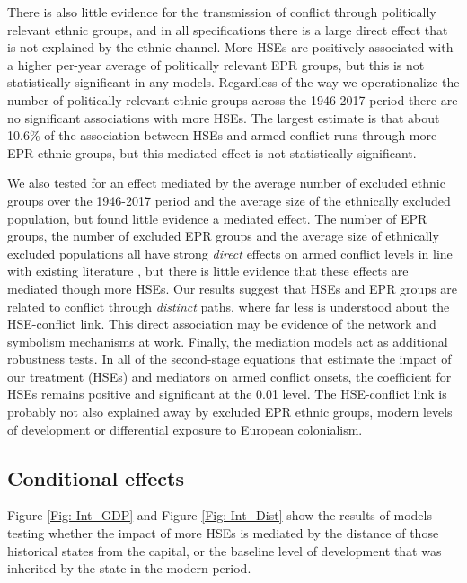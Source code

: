 There is also little evidence for the transmission of conflict through
politically relevant ethnic groups, and in all specifications there is a large
direct effect that is not explained by the ethnic channel. More HSEs are
positively associated with a higher per-year average of politically relevant EPR
groups, but this is not statistically significant in any models. Regardless of
the way we operationalize the number of politically relevant ethnic groups
across the 1946-2017 period 
there are no significant associations with more HSEs. The largest estimate is
that about 10.6\% of the association between HSEs and armed conflict runs
through more EPR ethnic groups, but this mediated effect is not statistically
significant. 

We also tested for an effect mediated by the average number of excluded ethnic
groups over the 1946-2017 period and the average size of the ethnically excluded
population, but found little evidence a mediated effect. The number of EPR
groups, the number of excluded EPR groups and the average size of ethnically
excluded populations all have strong \emph{direct} effects on armed conflict
levels in line with existing literature \citep{Buhaug2014, Cederman2010,
Cederman2013}, but there is little evidence that these effects are mediated
though more HSEs. Our results suggest that HSEs and EPR groups are related to
conflict through \textit{distinct} paths, where far less is understood about the
HSE-conflict link. This direct association may be evidence of the network and
symbolism mechanisms at work. Finally, the mediation models act as additional
robustness tests. In all of the second-stage equations that estimate the impact
of our treatment (HSEs) and mediators on armed conflict onsets, the coefficient
for HSEs remains positive and significant at the 0.01 level. The HSE-conflict
link is probably not also explained away by excluded EPR ethnic groups, modern
levels of development or differential exposure to European colonialism. 

\subsection{Conditional effects}

Figure \ref{Fig: Int_GDP} and  Figure \ref{Fig: Int_Dist} show the results of
models testing whether the impact of more
HSEs is mediated by the distance of those historical states from the capital, or
the baseline level of development that was inherited by the state in the modern
period. 

